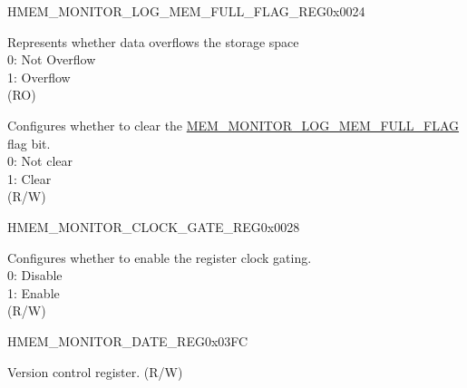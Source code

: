 \begin{register}{H}{MEM\_MONITOR\_LOG\_MEM\_FULL\_FLAG\_REG}{0x0024}\label{regdesc:MEMMONITORLOGMEMFULLFLAGREG}
%
%
%
\regnewline%
\begin{regdesc}\begin{reglist}
\label{fielddesc:MEMMONITORLOGMEMFULLFLAG}\item [MEM\_MONITOR\_LOG\_MEM\_FULL\_FLAG] Represents whether data overflows the storage space\\
0: Not Overflow\\
1: Overflow\\
(RO)
\label{fielddesc:MEMMONITORCLRLOGMEMFULLFLAG}\item [MEM\_MONITOR\_CLR\_LOG\_MEM\_FULL\_FLAG] Configures whether to clear the  \hyperref[fielddesc:MEMMONITORLOGMEMFULLFLAG]{MEM\_MONITOR\_LOG\_MEM\_FULL\_FLAG} flag bit. \\
0: Not clear\\
1: Clear\\
(R/W)
\end{reglist}\end{regdesc}
\end{register}

\begin{register}{H}{MEM\_MONITOR\_CLOCK\_GATE\_REG}{0x0028}\label{regdesc:MEMMONITORCLOCKGATEREG}
%
%
\regnewline%
\begin{regdesc}\begin{reglist}
\label{fielddesc:MEMMONITORCLKEN}\item [MEM\_MONITOR\_CLK\_EN] Configures whether to enable the register clock gating. \\
0: Disable\\
1: Enable\\
(R/W)
\end{reglist}\end{regdesc}
\end{register}

\begin{register}{H}{MEM\_MONITOR\_DATE\_REG}{0x03FC}\label{regdesc:MEMMONITORDATEREG}
%
%
\regnewline%
\begin{regdesc}\begin{reglist}
\label{fielddesc:MEMMONITORDATE}\item [MEM\_MONITOR\_DATE] Version control register. (R/W)
\end{reglist}\end{regdesc}
\end{register}
